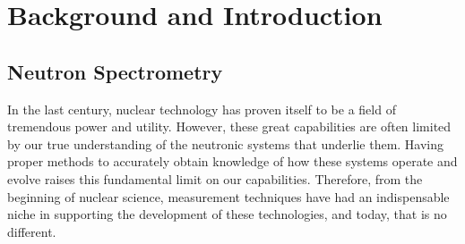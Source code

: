 
\cleardoublepage


\chapter{Background and Introduction}



\section{Neutron Spectrometry}
In the last century, nuclear technology has proven itself to be a field of tremendous power and utility.
However, these great capabilities are often limited by our true understanding of the neutronic systems that underlie them.
Having proper methods to accurately obtain knowledge of how these systems operate and evolve raises this fundamental limit on our capabilities.
Therefore, from the beginning of nuclear science, measurement techniques have had an indispensable niche in supporting the development of these technologies, and today, that is no different.


